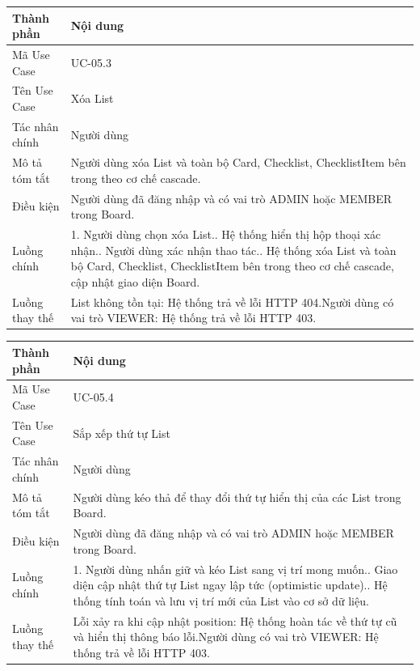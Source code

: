 \vspace{0.5cm}
\noindent\begin{tabular}{|p{3.5cm}|p{10.5cm}|}
\hline
\textbf{Thành phần} & \textbf{Nội dung} \\
\hline
Mã Use Case & UC-05.3 \\
\hline
Tên Use Case & Xóa List \\
\hline
Tác nhân chính & Người dùng \\
\hline
Mô tả tóm tắt & Người dùng xóa List và toàn bộ Card, Checklist, ChecklistItem bên trong theo cơ chế cascade. \\
\hline
Điều kiện & Người dùng đã đăng nhập và có vai trò ADMIN hoặc MEMBER trong Board. \\
\hline
Luồng chính & 1. Người dùng chọn xóa List.\newline 2. Hệ thống hiển thị hộp thoại xác nhận.\newline 3. Người dùng xác nhận thao tác.\newline 4. Hệ thống xóa List và toàn bộ Card, Checklist, ChecklistItem bên trong theo cơ chế cascade, cập nhật giao diện Board. \\
\hline
Luồng thay thế & List không tồn tại: Hệ thống trả về lỗi HTTP 404.\newline Người dùng có vai trò VIEWER: Hệ thống trả về lỗi HTTP 403. \\
\hline
\end{tabular}

\vspace{0.5cm}
\noindent\begin{tabular}{|p{3.5cm}|p{10.5cm}|}
\hline
\textbf{Thành phần} & \textbf{Nội dung} \\
\hline
Mã Use Case & UC-05.4 \\
\hline
Tên Use Case & Sắp xếp thứ tự List \\
\hline
Tác nhân chính & Người dùng \\
\hline
Mô tả tóm tắt & Người dùng kéo thả để thay đổi thứ tự hiển thị của các List trong Board. \\
\hline
Điều kiện & Người dùng đã đăng nhập và có vai trò ADMIN hoặc MEMBER trong Board. \\
\hline
Luồng chính & 1. Người dùng nhấn giữ và kéo List sang vị trí mong muốn.\newline 2. Giao diện cập nhật thứ tự List ngay lập tức (optimistic update).\newline 3. Hệ thống tính toán và lưu vị trí mới của List vào cơ sở dữ liệu. \\
\hline
Luồng thay thế & Lỗi xảy ra khi cập nhật position: Hệ thống hoàn tác về thứ tự cũ và hiển thị thông báo lỗi.\newline Người dùng có vai trò VIEWER: Hệ thống trả về lỗi HTTP 403. \\
\hline
\end{tabular}

